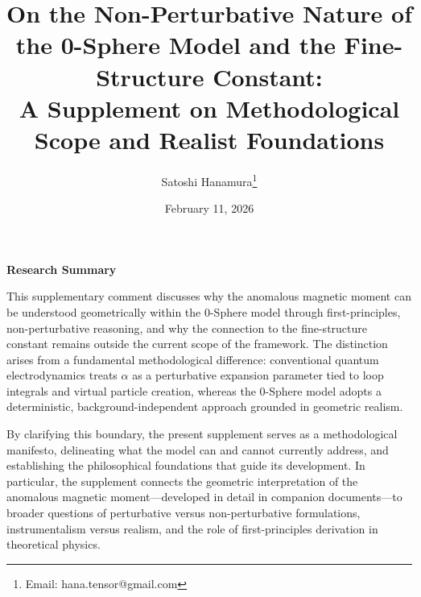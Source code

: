 \documentclass[12pt,letterpaper]{article}
\begin{document}
\title{On the Non-Perturbative Nature of the 0-Sphere Model and the Fine-Structure Constant:\\
\normalsize A Supplement on Methodological Scope and Realist Foundations}

\author{Satoshi Hanamura\thanks{Email: hana.tensor@gmail.com}}
\date{February 11, 2026}

\maketitle

\tableofcontents

\clearpage

\begin{center}
\textbf{Research Summary}
\end{center}

\justifying
This supplementary comment discusses why the anomalous magnetic moment can be understood geometrically within the 0-Sphere model through first-principles, non-perturbative reasoning, and why the connection to the fine-structure constant remains outside the current scope of the framework. The distinction arises from a fundamental methodological difference: conventional quantum electrodynamics treats $\alpha$ as a perturbative expansion parameter tied to loop integrals and virtual particle creation, whereas the 0-Sphere model adopts a deterministic, background-independent approach grounded in geometric realism.

By clarifying this boundary, the present supplement serves as a methodological manifesto, delineating what the model can and cannot currently address, and establishing the philosophical foundations that guide its development. In particular, the supplement connects the geometric interpretation of the anomalous magnetic moment—developed in detail in companion documents—to broader questions of perturbative versus non-perturbative formulations, instrumentalism versus realism, and the role of first-principles derivation in theoretical physics.

\clearpage

\end{document}
